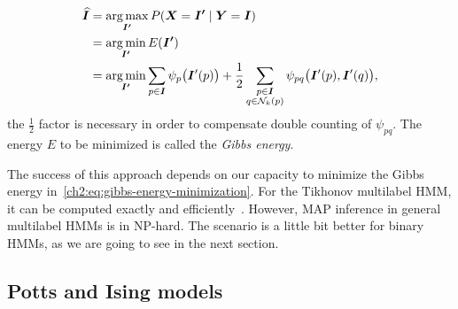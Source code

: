 \begin{align}
	\widehat{\bm{I}} &= \operatorname*{arg\,max}_{\bm{I'}}{P(\bm{X}=\bm{I'} \; | \; \bm{Y} = \bm{I} }) \nonumber \\
	&= \operatorname*{arg\,min}_{\bm{I'}}{E(\bm{I'})} \nonumber \\
	&= \operatorname*{arg\,min}_{\bm{I'}}{\sum_{p \in \bm{I}}{\psi_p\big({\bm{I}'(p)}\big)}} + \frac{1}{2}\sum_{ \substack{ p \in \bm{I} \\ q \in \mathcal{N}_k(p)}}{\psi_{pq}\big( {\bm{I}'(p),\bm{I}'(q) \big)}},
	\label{ch2:eq:gibbs-energy-minimization}
\end{align}
%
the $\frac{1}{2}$ factor is necessary in order to compensate double counting of $\psi_{pq}$. The energy $E$ to be minimized is called the \emph{Gibbs energy}.



The success of this approach depends on our capacity to minimize the Gibbs energy in~\cref{ch2:eq:gibbs-energy-minimization}. For the Tikhonov multilabel HMM, it can be computed exactly and efficiently~\cite{ishikawa03}. However, MAP inference in general multilabel HMMs is in NP-hard. The scenario is a little bit better for binary HMMs, as we are going to see in the next section.

\subsection{Potts and Ising models}

